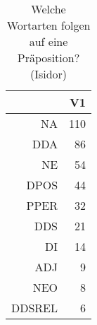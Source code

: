 \begin{table}[ht]
\centering
\begin{tabular}{rr}
  \hline
 & V1 \\ 
  \hline
NA & 110 \\ 
  DDA &  86 \\ 
  NE &  54 \\ 
  DPOS &  44 \\ 
  PPER &  32 \\ 
  DDS &  21 \\ 
  DI &  14 \\ 
  ADJ &   9 \\ 
  NEO &   8 \\ 
  DDSREL &   6 \\ 
   \hline
\end{tabular}
\caption{Welche Wortarten folgen auf eine Präposition?  (Isidor)} 
\end{table}
